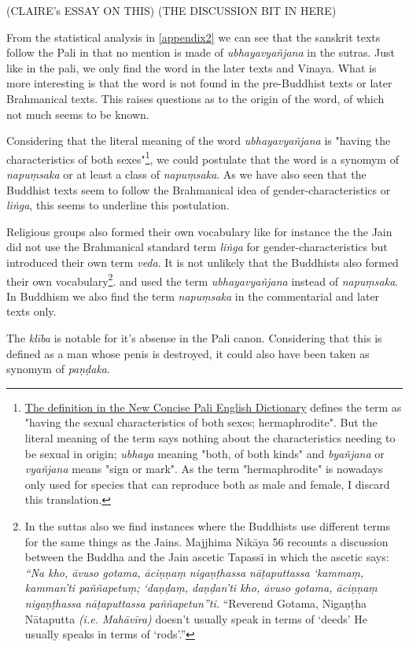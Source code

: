 (CLAIRE's ESSAY ON THIS)
(THE DISCUSSION BIT IN HERE)


From the statistical analysis in \ref{appendix2} we can see that the sanskrit texts follow the Pali in that no mention is made of {\em ubhayavyañjana} in the sutras. Just like in the pali, we only find the word in the later texts and Vinaya. What is more interesting is that the word is not found in the pre-Buddhist texts or later Brahmanical texts. This raises questions as to the origin of the word, of which not much seems to be known.

Considering that the literal meaning of the word {\em ubhayavyañjana} is "having the characteristics of both sexes"\footnote{\href{https://suttacentral.net/define/ubhatovya%C3%B1janaka}{The definition in the New Concise Pali English Dictionary} defines the term as "having the sexual characteristics of both sexes; hermaphrodite". But the literal meaning of the term says nothing about the characteristics needing to be sexual in origin; {\em ubhaya} meaning "both, of both kinds" and {\em byañjana} or {\em vyañjana} means "sign or mark". As the term "hermaphrodite" is nowadays only used for species that can reproduce both as male and female, I discard this translation.}, we could postulate that the word is a synomym of {\em napuṃsaka} or at least a class of {\em napuṃsaka}. As we have also seen that the Buddhist texts seem to follow the Brahmanical idea of gender-characteristics or {\em liṅga}, this seems to underline this postulation.

Religious groups also formed their own vocabulary like for instance the the Jain did not use the Brahmanical standard term {\em liṅga} for gender-characteristics but introduced their own term {\em veda}. It is not unlikely that the Buddhists also formed their own vocabulary\footnote{In the suttas also we find instances where the Buddhists use different terms for the same things as the Jains. Majjhima Nikāya 56 recounts a discussion between the Buddha and the Jain ascetic Tapassī in which the ascetic says: {\em “Na kho, āvuso gotama, āciṇṇaṃ nigaṇṭhassa nāṭaputtassa ‘kammaṃ, kamman’ti paññapetuṃ; ‘daṇḍaṃ, daṇḍan’ti kho, āvuso gotama, āciṇṇaṃ nigaṇṭhassa nāṭaputtassa paññapetun”ti.} “Reverend Gotama, Nigaṇṭha Nātaputta {\em (i.e. Mahāvīra)} doesn’t usually speak in terms of ‘deeds’ He usually speaks in terms of ‘rods’.” }. and used the term {\em ubhayavyañjana} instead of {\em napuṃsaka}. In Buddhism we also find the term {\em napuṃsaka} in the commentarial and later texts only.


The {\em klība} is notable for it's absense in the Pali canon. Considering that this is defined as a man whose penis is destroyed, it could also have been taken as synomym of {\em paṇḍaka}.